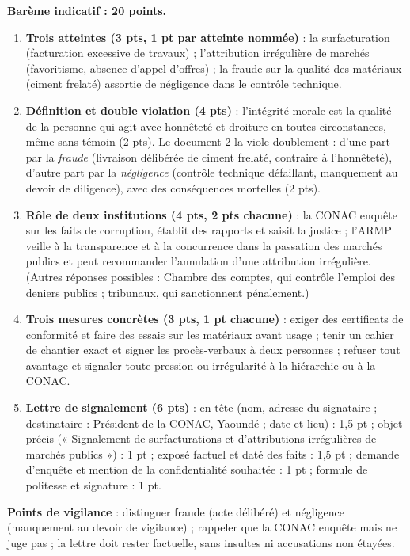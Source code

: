 \documentclass[11pt]{article}
\begin{document}
\begin{corrige}
\textbf{Barème indicatif : 20 points.}

\begin{enumerate}
\item \textbf{Trois atteintes (3 pts, 1 pt par atteinte nommée)} : la surfacturation (facturation excessive de travaux) ; l'attribution irrégulière de marchés (favoritisme, absence d'appel d'offres) ; la fraude sur la qualité des matériaux (ciment frelaté) assortie de négligence dans le contrôle technique.
\item \textbf{Définition et double violation (4 pts)} : l'intégrité morale est la qualité de la personne qui agit avec honnêteté et droiture en toutes circonstances, même sans témoin (2 pts). Le document 2 la viole doublement : d'une part par la \emph{fraude} (livraison délibérée de ciment frelaté, contraire à l'honnêteté), d'autre part par la \emph{négligence} (contrôle technique défaillant, manquement au devoir de diligence), avec des conséquences mortelles (2 pts).
\item \textbf{Rôle de deux institutions (4 pts, 2 pts chacune)} : la CONAC enquête sur les faits de corruption, établit des rapports et saisit la justice ; l'ARMP veille à la transparence et à la concurrence dans la passation des marchés publics et peut recommander l'annulation d'une attribution irrégulière. (Autres réponses possibles : Chambre des comptes, qui contrôle l'emploi des deniers publics ; tribunaux, qui sanctionnent pénalement.)
\item \textbf{Trois mesures concrètes (3 pts, 1 pt chacune)} : exiger des certificats de conformité et faire des essais sur les matériaux avant usage ; tenir un cahier de chantier exact et signer les procès-verbaux à deux personnes ; refuser tout avantage et signaler toute pression ou irrégularité à la hiérarchie ou à la CONAC.
\item \textbf{Lettre de signalement (6 pts)} : en-tête (nom, adresse du signataire ; destinataire : Président de la CONAC, Yaoundé ; date et lieu) : 1,5 pt ; objet précis (« Signalement de surfacturations et d'attributions irrégulières de marchés publics ») : 1 pt ; exposé factuel et daté des faits : 1,5 pt ; demande d'enquête et mention de la confidentialité souhaitée : 1 pt ; formule de politesse et signature : 1 pt.
\end{enumerate}
\textbf{Points de vigilance} : distinguer fraude (acte délibéré) et négligence (manquement au devoir de vigilance) ; rappeler que la CONAC enquête mais ne juge pas ; la lettre doit rester factuelle, sans insultes ni accusations non étayées.
\end{corrige}
\end{document}
